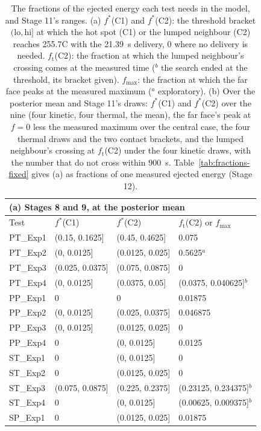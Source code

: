 \documentclass[preprint,12pt]{elsarticle}
\begin{document}
\begin{table}[p]
\centering
\scriptsize
\caption{The fractions of the ejected energy each test needs in the model, and Stage 11's ranges. (a) $f^*$(C1) and $f^*$(C2): the threshold bracket $(\mathrm{lo},\mathrm{hi}]$ at which the hot spot (C1) or the lumped neighbour (C2) reaches 255.7\textdegree C with the 21.39~s delivery, 0 where no delivery is needed. $f_\mathrm{t}$(C2): the fraction at which the lumped neighbour's crossing comes at the measured time ($^{b}$ the search ended at the threshold, its bracket given). $f_\mathrm{max}$: the fraction at which the far face peaks at the measured maximum ($^{a}$ exploratory). (b) Over the posterior mean and Stage 11's draws: $f^*$(C1) and $f^*$(C2) over the nine (four kinetic, four thermal, the mean), the far face's peak at $f=0$ less the measured maximum over the central case, the four thermal draws and the two contact brackets, and the lumped neighbour's crossing at $f_\mathrm{t}$(C2) under the four kinetic draws, with the number that do not cross within 900~s. Table~\ref{tab:fractions-fixed} gives (a) as fractions of one measured ejected energy (Stage 12).}
\label{tab:fractions}
\begin{tabular}{llll}
\multicolumn{4}{l}{(a) Stages 8 and 9, at the posterior mean} \\
\toprule
Test & $f^*$(C1) & $f^*$(C2) & $f_\mathrm{t}$(C2) or $f_\mathrm{max}$ \\
\midrule
PT\_Exp1 & (0.15, 0.1625] & (0.45, 0.4625] & 0.075 \\
PT\_Exp2 & (0, 0.0125] & (0.0125, 0.025] & 0.5625$^{a}$ \\
PT\_Exp3 & (0.025, 0.0375] & (0.075, 0.0875] & 0 \\
PT\_Exp4 & (0, 0.0125] & (0.0375, 0.05] & (0.0375, 0.040625]$^{b}$ \\
PP\_Exp1 & 0 & 0 & 0.01875 \\
PP\_Exp2 & (0, 0.0125] & (0.025, 0.0375] & 0.046875 \\
PP\_Exp3 & (0, 0.0125] & (0.0125, 0.025] & 0 \\
PP\_Exp4 & 0 & (0, 0.0125] & 0.0125 \\
ST\_Exp1 & 0 & (0, 0.0125] & 0 \\
ST\_Exp2 & 0 & (0.0125, 0.025] & 0 \\
ST\_Exp3 & (0.075, 0.0875] & (0.225, 0.2375] & (0.23125, 0.234375]$^{b}$ \\
ST\_Exp4 & 0 & (0, 0.0125] & (0.00625, 0.009375]$^{b}$ \\
SP\_Exp1 & 0 & (0.0125, 0.025] & 0.01875 \\

\end{tabular}
\end{table}
\end{document}
